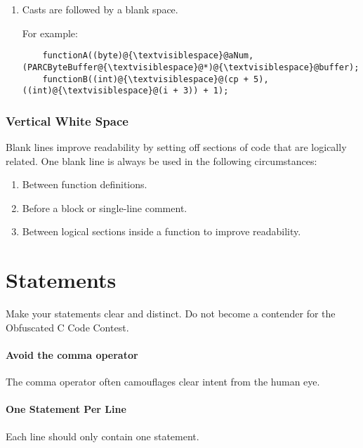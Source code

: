 \documentclass[fleqn,12pt]{PARCOneColumn} %
\begin{document}
\begin{enumerate}
For example:

\begin{lstlisting}
    for@{\textvisiblespace}@(expr1;@{\textvisiblespace}@expr2;@{\textvisiblespace}@expr3)@{\textvisiblespace}@{
       @{{\it statements...}}@
    }
\end{lstlisting}

\item Casts are followed by a blank space.

For example:
\begin{lstlisting}
    functionA((byte)@{\textvisiblespace}@aNum, (PARCByteBuffer@{\textvisiblespace}@*)@{\textvisiblespace}@buffer);
    functionB((int)@{\textvisiblespace}@(cp + 5), ((int)@{\textvisiblespace}@(i + 3)) + 1);
\end{lstlisting}
\end{enumerate}

\subsubsection{Vertical White Space}

Blank lines improve readability by setting off sections of code that are
logically related. One blank line is always be used in the following circumstances:
\begin{enumerate}
\item Between function definitions.
\item Before a block or single-line comment.
\item Between logical sections inside a function to improve readability.
\end{enumerate}
\section{Statements}
Make your statements clear and distinct.
Do not become a contender for the Obfuscated C Code Contest.

\paragraph{Avoid the comma operator}
The comma operator often camouflages clear intent from the human eye.

\paragraph{One Statement Per Line}
Each line should only contain one statement.
\end{document}
